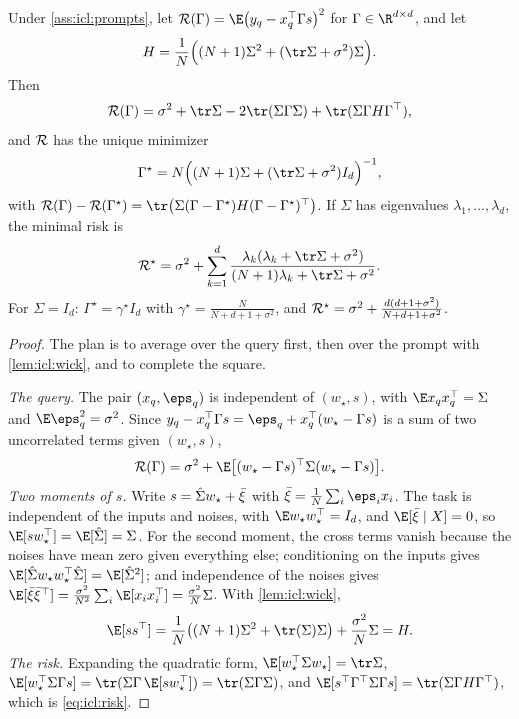 \begin{refsection}
\begin{theorem}\label{thm:icl:onestep}
Under \cref{ass:icl:prompts}, let $\cR(\Gamma)=\E\bigl(y_q-x_q^\top\Gamma s\bigr)^2$ for $\Gamma\in\R^{d\times d}$, and let
\[
  H=\frac1N\Bigl((N+1)\Sigma^2+(\tr\Sigma+\sigma^2)\Sigma\Bigr).
\]
Then
\begin{equation}\label{eq:icl:risk}
  \cR(\Gamma)=\sigma^2+\tr\Sigma-2\tr(\Sigma\Gamma\Sigma)+\tr(\Sigma\Gamma H\Gamma^\top),
\end{equation}
and $\mathcal{R}$ has the unique minimizer
\begin{equation}\label{eq:icl:gammastar}
  \Gamma^\star=N\Bigl((N+1)\Sigma+(\tr\Sigma+\sigma^2)I_d\Bigr)^{-1},
\end{equation}
with $\cR(\Gamma)-\cR(\Gamma^\star)=\tr\bigl(\Sigma(\Gamma-\Gamma^\star)H(\Gamma-\Gamma^\star)^\top\bigr)$. If $\Sigma$ has eigenvalues $\lambda_1,\dots,\lambda_d$, the minimal risk is
\begin{equation}\label{eq:icl:riskstar}
  \cR^\star=\sigma^2+\sum_{k=1}^d\frac{\lambda_k(\lambda_k+\tr\Sigma+\sigma^2)}{(N+1)\lambda_k+\tr\Sigma+\sigma^2} .
\end{equation}
For $\Sigma=I_d$: $\Gamma^\star=\gamma^\star I_d$ with $\gamma^\star=\frac{N}{N+d+1+\sigma^2}$, and $\mathcal{R}^\star=\sigma^2+\frac{d(d+1+\sigma^2)}{N+d+1+\sigma^2}$.
\end{theorem}

\begin{proof}
The plan is to average over the query first, then over the prompt with \cref{lem:icl:wick}, and to complete the square.

\emph{The query.} The pair $(x_q,\eps_q)$ is independent of $(w_\star,s)$, with $\E x_qx_q^\top=\Sigma$ and $\E\eps_q^2=\sigma^2$. Since $y_q-x_q^\top\Gamma s=\eps_q+x_q^\top(w_\star-\Gamma s)$ is a sum of two uncorrelated terms given $(w_\star,s)$,
\[
  \cR(\Gamma)=\sigma^2+\E\bigl[(w_\star-\Gamma s)^\top\Sigma(w_\star-\Gamma s)\bigr].
\]
\emph{Two moments of $s$.} Write $s=\hat\Sigma w_\star+\bar\xi$ with $\bar\xi=\frac1N\sum_i\eps_ix_i$. The task is independent of the inputs and noises, with $\E w_\star w_\star^\top=I_d$, and $\E[\bar\xi\mid X]=0$, so $\E[sw_\star^\top]=\E[\iclShat]=\Sigma$. For the second moment, the cross terms vanish because the noises have mean zero given everything else; conditioning on the inputs gives $\E[\iclShat w_\star w_\star^\top\iclShat]=\E[\iclShat^2]$; and independence of the noises gives $\E[\bar\xi\bar\xi^\top]=\frac{\sigma^2}{N^2}\sum_i\E[x_ix_i^\top]=\frac{\sigma^2}N\Sigma$. With \cref{lem:icl:wick},
\[
  \E[ss^\top]=\frac1N\bigl((N+1)\Sigma^2+\tr(\Sigma)\Sigma\bigr)+\frac{\sigma^2}N\Sigma=H .
\]
\emph{The risk.} Expanding the quadratic form, $\E[w_\star^\top\Sigma w_\star]=\tr\Sigma$, $\E[w_\star^\top\Sigma\Gamma s]=\tr(\Sigma\Gamma\,\E[sw_\star^\top])=\tr(\Sigma\Gamma\Sigma)$, and $\E[s^\top\Gamma^\top\Sigma\Gamma s]=\tr(\Sigma\Gamma H\Gamma^\top)$, which is \eqref{eq:icl:risk}.


\end{proof}
\end{refsection}
